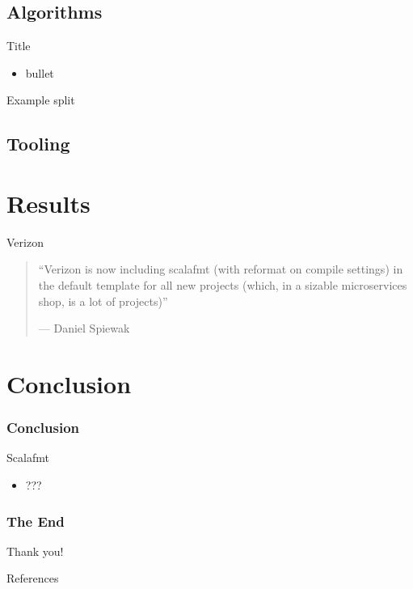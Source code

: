 \documentclass[xcolor=dvipsnames]{beamer}
\theoremstyle{definition}
\begin{document}
\subsection{Algorithms} %

\begin{frame}{Title}
  \begin{itemize}
    \item bullet
  \end{itemize}
\end{frame}

\begin{frame}{Example split}
  
\end{frame}

\subsection{Tooling} %

\section{Results} %
\label{sec:Results}

\begin{frame}{Verizon}
  \begin{quote}
    ``Verizon is now including scalafmt (with reformat on compile settings) in
    the default template for all new projects (which, in a sizable
    microservices shop, is a lot of projects)''

    \hfill --- Daniel Spiewak
  \end{quote}
\end{frame}

\section{Conclusion} %
\label{sec:Conclusion}

\begin{frame}[fragile]
  \frametitle{Conclusion}
    \begin{block}{Scalafmt}
      \begin{itemize}
        \item ???
      \end{itemize}
    \end{block}
\end{frame}

\begin{frame}[fragile]
  \frametitle{The End}
    \begin{center}
      \Huge
        Thank you!
    \end{center}
\end{frame}

\begin{frame}{References}
  \printbibliography{}
\end{frame}

\end{document}
